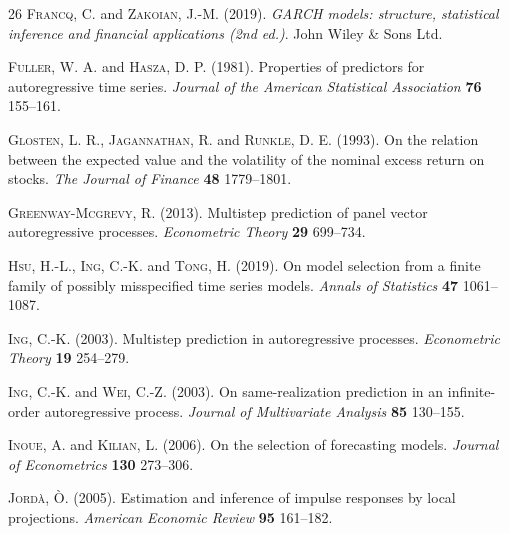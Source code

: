 \documentclass[ejsv2]{imsart}
\theoremstyle{plain}
\theoremstyle{definition}
\theoremstyle{remark}
\begin{document}
\begin{thebibliography}{26}
\textsc{Francq, C.} and \textsc{Zakoian, J.-M.} (2019). \textit{GARCH models: structure, statistical inference and financial applications (2nd ed.)}. John Wiley \& Sons Ltd.

\textsc{Fuller, W. A.} and \textsc{Hasza, D. P.} (1981). Properties of predictors for autoregressive time series. \textit{Journal of the American Statistical Association}
\textbf{76} 155--161.

\textsc{Glosten, L. R.}, \textsc{Jagannathan, R.} and \textsc{Runkle, D. E.} (1993). On the relation between the expected value and the volatility of the
  nominal excess return on stocks. \textit{The Journal of Finance}
\textbf{48} 1779--1801.

\textsc{Greenway-Mcgrevy, R.} (2013). Multistep prediction of panel vector autoregressive processes. \textit{Econometric Theory}
\textbf{29} 699--734.


\textsc{Hsu, H.-L.}, \textsc{Ing, C.-K.} and \textsc{Tong, H.} (2019). On model selection from a finite family of possibly misspecified time
  series models. \textit{Annals of Statistics}
\textbf{47} 1061--1087.

\textsc{Ing, C.-K.} (2003). Multistep prediction in autoregressive processes. \textit{Econometric Theory}
\textbf{19} 254--279.

\textsc{Ing, C.-K.} and \textsc{Wei, C.-Z.} (2003). On same-realization prediction in an infinite-order autoregressive
  process. \textit{Journal of Multivariate Analysis}
\textbf{85} 130--155.

\textsc{Inoue, A.} and \textsc{Kilian, L.} (2006). 
On the selection of forecasting models.
\textit{Journal of Econometrics}
\textbf{130} 273--306.

\textsc{Jord\`{a}, \`{O}.} (2005). Estimation and inference of impulse responses by local projections. \textit{American Economic Review}
\textbf{95} 161--182.


\end{thebibliography}
\end{document}
